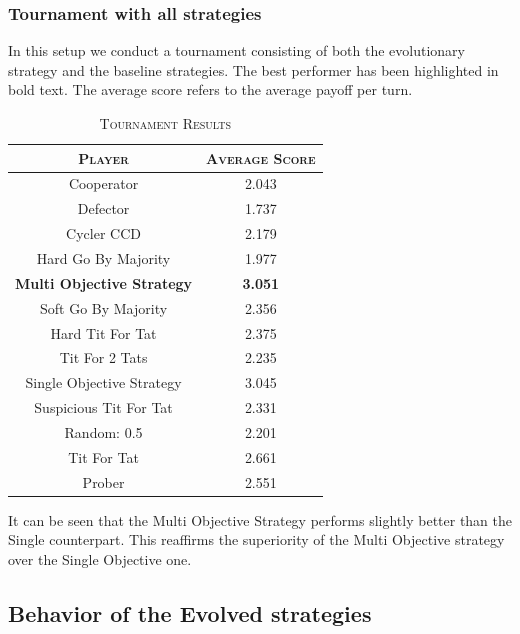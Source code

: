 \documentclass[a4paper]{article}
\begin{document}
	\subsubsection{Tournament with all strategies}
	
In this setup we conduct a tournament consisting of both the evolutionary strategy and the baseline strategies. The best performer has been highlighted in bold text. The average score refers to the average payoff per turn.	
	
	\begin{table}[H]
	  \begin{center}
	    \begin{tabular}{c|c}
	      \toprule
	      \textsc{Player} & \textsc{Average Score}\\
	      \midrule
			Cooperator & 2.043\\
			Defector & 1.737\\
			Cycler CCD & 2.179\\
			Hard Go By Majority & 1.977\\
			\textbf{Multi Objective Strategy} & \textbf{3.051}\\
			Soft Go By Majority & 2.356\\
			Hard Tit For Tat & 2.375\\
			Tit For 2 Tats & 2.235\\
			{Single Objective Strategy} & {3.045}\\
			Suspicious Tit For Tat & 2.331\\
			Random: 0.5 & 2.201\\
			Tit For Tat & 2.661\\
			Prober & 2.551\\
		  \bottomrule
	    \end{tabular}
	    \caption{\textsc{Tournament Results}}
	  \end{center}
	\end{table}  

	It can be seen that the Multi Objective Strategy performs slightly better than the Single counterpart. This reaffirms the superiority of the Multi Objective strategy over the Single Objective one.
		
	\subsection{Behavior of the Evolved strategies}
\end{document}
